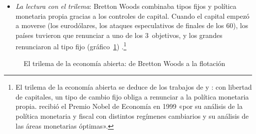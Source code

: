 \documentclass[11pt]{article}
\begin{document}
\begin{itemize}
\item \emph{La lectura con el trilema}: Bretton Woods combinaba tipos fijos y política monetaria propia gracias a los controles de capital. Cuando el capital empezó a moverse (los eurodólares, los ataques especulativos de finales de los 60), los países tuvieron que renunciar a uno de los 3~objetivos, y los grandes renunciaron al tipo fijo (gráfico~\ref{fig:trilema-ruptura})\nocite{ObstfeldShambaughTaylor2005} .\footnote{El trilema de la economía abierta se deduce de los trabajos de \textcite{Fleming1962Domestic} y \textcite{Mundell1963Capital}: con libertad de capitales, un tipo de cambio fijo obliga a renunciar a la política monetaria propia.  recibió el Premio Nobel de Economía en 1999 «por su análisis de la política monetaria y fiscal con distintos regímenes cambiarios y su análisis de las áreas monetarias óptimas»\nocite{Nobel1999Mundell}.}
\end{itemize}

\begin{figure}[H]
\centering
\caption{El trilema de la economía abierta: de Bretton Woods a la flotación}\label{fig:trilema-ruptura}
\end{figure}
\end{document}
